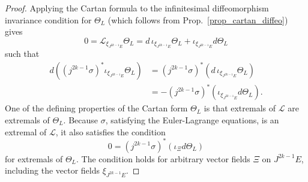 \begin{proof}
  Applying the Cartan formula to the infinitesimal diffeomorphism invariance condition for $\Theta_L$ (which follows from Prop.~\ref{prop_cartan_diffeo}) gives
  \begin{equation}
    0 = \mathcal L_{\xi_{J^{2k-1}E}} \Theta_L = d\,\iota_{\xi_{J^{2k-1}E}} \Theta_L + \iota_{\xi_{J^{2k-1}E}} d \Theta_L
  \end{equation}
  such that
  \begin{equation}
    \begin{aligned}
      d \left((j^{2k-1}\sigma)^\ast \iota_{\xi_{J^{2k-1}E}} \Theta_L \right) &{} = (j^{2k-1}\sigma)^\ast ( d\,\iota_{\xi_{J^{2k-1}E}} \Theta_L ) \\
                                                                             &{} = -(j^{2k-1}\sigma)^\ast (\iota_{\xi_{J^{2k-1}E}} d \Theta_L ).
    \end{aligned}
  \end{equation}
  One of the defining properties of the Cartan form $\Theta_L$ is that extremals of $\mathscr L$ are extremals of $\Theta_L$. Because $\sigma$, satisfying the Euler-Lagrange equations, is an extremal of $\mathscr L$, it also satisfies the condition\cite{}
  \begin{equation}
    0 = (j^{2k-1}\sigma)^\ast (\iota_\Xi d \Theta_L)
  \end{equation}
  for extremals of $\Theta_L$. The condition holds for arbitrary vector fields $\Xi$ on $J^{2k-1}E$, including the vector fields $\xi_{J^{2k-1}E}$.
\end{proof}

